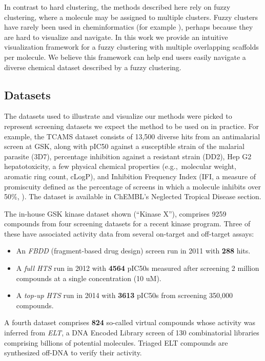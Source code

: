 \documentclass[journal=jacsat,biochem,manuscript=article]{achemso}
\newcommand*\eg{e.g.,~}
\begin{document}
In contrast to hard clustering, the methods described
here rely on fuzzy clustering, where a molecule may be assigned to
multiple clusters. Fuzzy clusters have rarely been used in
cheminformatics (for example \cite{Holliday2004,Richmond2013Galois}),
perhaps because they are hard to visualize and navigate.  In this work
we provide an intuitive visualization framework for a fuzzy clustering with
multiple overlapping scaffolds per molecule. We believe this framework can help end
users easily navigate a diverse chemical dataset described by a fuzzy clustering.


\subsection{Datasets}
\label{sec:datasets}
The datasets used to illustrate and visualize our methods were picked
to represent screening datasets we expect the method to
be used on in practice. For example, the TCAMS dataset\cite{Gamo2010}
consists of 13,500 diverse hits from an antimalarial screen at GSK,
along with pIC50 against a susceptible strain of the malarial parasite
(3D7), percentage inhibition against a resistant strain (DD2), Hep G2
hepatotoxicity, a few physical chemical properties (\eg molecular
weight, aromatic ring count, cLogP), and Inhibition Frequency Index
(IFI, a measure of promiscuity defined as the percentage of screens in
which a molecule inhibits over 50\%, \cite{Chakravorty2013IFI}). The dataset is available in Ch{EMBL}'s Neglected Tropical Disease section\cite{ChEMBLNTD}.

The in-house GSK kinase dataset shown (``Kinase X''), comprises 9259
compounds from four screening datasets for a recent kinase program.
Three of these have associated activity data from several on-target and off-target
assays: 
\begin{itemize}
\item An {\it FBDD}\cite{FBDD} (fragment-based drug design) screen run in 2011 with {\bf 288} hits.
\item A {\it full HTS} run in 2012 with {\bf 4564} {pIC50s} measured after screening 2 million compounds at a single concentration (10 uM).
\item A {\it top-up HTS} run in 2014 with {\bf 3613} {pIC50s} from screening 350,000 compounds.
\end{itemize}
A fourth dataset comprises {\bf 824} so-called virtual compounds whose activity was inferred from {\it ELT}, a DNA Encoded Library screen\cite{ELT} of 130
combinatorial libraries comprising billions of potential molecules. Triaged ELT compounds are synthesized off-DNA to verify their activity. 
\end{document}
